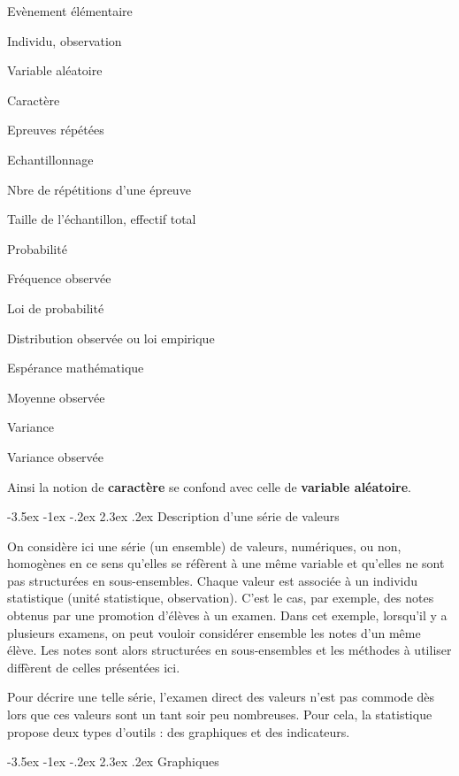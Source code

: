 \documentclass[]{book}
\makeatletter
\renewcommand\section{\@startsection {section}{1}{\z@}%
                                   {-3.5ex \@plus -1ex \@minus -.2ex}%
                                   {2.3ex \@plus.2ex}%
                                   {\normalfont\Large\bfseries\color{ForestGreen}}}
\theoremstyle{magentacolor}
\theoremstyle{proprie}
\theoremstyle{exstyle}
\theoremstyle{exostyle}
\theoremstyle{definition}
\theoremstyle{definition}
\theoremstyle{definition}
\theoremstyle{remark}
\let\BeginKnitrBlock\begin \let\EndKnitrBlock\end
\makeatother
\begin{document}
Evènement élémentaire

Individu, observation

Variable aléatoire

Caractère

Epreuves répétées

Echantillonnage

Nbre de répétitions d'une épreuve

Taille de l'échantillon, effectif total

Probabilité

Fréquence observée

Loi de probabilité

Distribution observée ou loi empirique

Espérance mathématique

Moyenne observée

Variance

Variance observée

\BeginKnitrBlock{rmdtip}
Ainsi la notion de \textbf{caractère} se confond avec celle de \textbf{variable aléatoire}.
\EndKnitrBlock{rmdtip}

\hypertarget{description-dune-serie-de-valeurs}{%
\section{Description d'une série de valeurs}\label{description-dune-serie-de-valeurs}}

On considère ici une série (un ensemble) de valeurs, numériques, ou non, homogènes en ce sens qu'elles se réfèrent à une même variable et qu'elles ne sont pas structurées en sous-ensembles. Chaque valeur est associée à un individu statistique (unité statistique, observation). C'est le cas, par exemple, des notes obtenus par une promotion d'élèves à un examen. Dans cet exemple, lorsqu'il y a plusieurs examens, on peut vouloir considérer ensemble les notes d'un même élève. Les notes sont alors structurées en sous-ensembles et les méthodes à utiliser diffèrent de celles présentées ici.

Pour décrire une telle série, l'examen direct des valeurs n'est pas commode dès lors que ces valeurs sont un tant soir peu nombreuses. Pour cela, la statistique propose deux types d'outils : des graphiques et des indicateurs.

\hypertarget{graphiques}{%
\section{Graphiques}\label{graphiques}}
\end{document}

